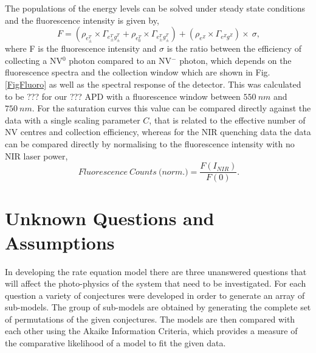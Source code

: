 \documentclass[preprint,prl]{revtex4}
\begin{document}
The populations of the energy levels can be solved under steady state conditions and the fluorescence intensity is given by,
\begin{equation}
\SI{}{F} = \left(\rho_{e^{T}_\pm}\times\Gamma_{e^T_{\pm}g^T_{\pm}} +\rho_{e^{T}_0}\times\Gamma_{e^T_{\pm}g^T_{\pm}}\right)+\left(\rho_{e^Z}\times\Gamma_{e^Zg^Z}\right)\times\SI{}{\sigma},
\label{EqnFluoro}
\end{equation}
where F is the fluorescence intensity and $\sigma$ is the ratio between the efficiency of collecting a NV$^0$ photon compared to an NV$^-$ photon, which depends on the fluorescence spectra and the collection window which are shown in Fig. \ref{FigFluoro} as well as the spectral response of the detector. This was calculated to be ??? for our ??? APD with a fluorescence window between $\SI{550}{nm}$ and $\SI{750}{nm}$. For the saturation curves this value can be compared directly against the data with a single scaling parameter $C$, that is related to the effective number of NV centres and collection efficiency, whereas for the NIR quenching data the data can be compared directly by normalising to the fluorescence intensity with no NIR laser power,
\begin{equation}
\SI{}{Fluorescence\ Counts\ (norm}.) = \frac{F(I_{NIR})}{F(0)}.
\label{EqnFluoroCounts}
\end{equation}

\section{Unknown Questions and Assumptions }
In developing the rate equation model there are three unanswered questions that will affect the photo-physics of the system that need to be investigated. For each question a variety of conjectures were developed in order to generate an array of sub-models. The group of sub-models are obtained by generating the complete set of permutations of the given conjectures. The models are then compared with each other using the Akaike Information Criteria, which provides a measure of the comparative likelihood of a model to fit the given data.
\end{document}
